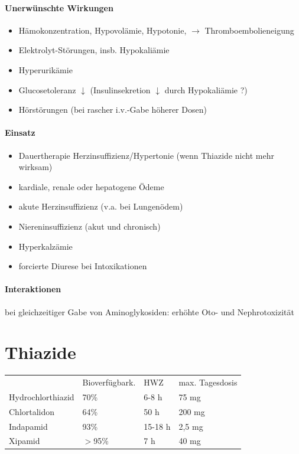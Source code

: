 \documentclass[10pt,a4paper]{report}
\begin{document}
\paragraph{Unerwünschte Wirkungen}
\begin{itemize}
	\item Hämokonzentration, Hypovolämie, Hypotonie, $\rightarrow$ Thromboembolieneigung
	\item Elektrolyt-Störungen, insb. Hypokaliämie
	\item Hyperurikämie    
	\item Glucosetoleranz $\downarrow$ (Insulinsekretion $\downarrow$ durch Hypokaliämie ?)
	\item Hörstörungen (bei rascher i.v.-Gabe höherer Dosen)
\end{itemize}
\paragraph{Einsatz}
\begin{itemize}
	\item Dauertherapie Herzinsuffizienz/Hypertonie (wenn Thiazide nicht mehr wirksam)
	\item kardiale, renale oder hepatogene Ödeme
	\item akute Herzinsuffizienz (v.a. bei Lungenödem)
	\item Niereninsuffizienz (akut und chronisch)
	\item Hyperkalzämie
	\item forcierte Diurese bei Intoxikationen
\end{itemize}
\paragraph{Interaktionen}
bei gleichzeitiger Gabe von Aminoglykosiden: erhöhte Oto- und Nephrotoxizität
\section{Thiazide}
\begin{tabularx}{\textwidth}{XXXX}
&Bioverfügbark.&HWZ&max. Tagesdosis\\ 
Hydrochlorthiazid&70\%&6-8 h&75 mg\\
Chlortalidon&64\%&50 h&200 mg\\
Indapamid&93\%&15-18 h&2,5 mg\\
Xipamid&$>$95\%&7 h&40 mg\\
\end{tabularx}
\end{document}
